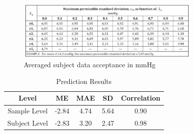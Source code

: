 \documentclass{article}
\begin{document}
\begin{figure}[H]
\centering
\includegraphics[width=0.8\textwidth]{./Fig/ME_STD_Correspond.png}
\caption{Averaged subject data acceptance in mmHg}
\label{ME_STD}
\end{figure}

\begin{table}[h!]
\centering
\begin{tabular}{|c|c|c|c|c|}
\hline
Level & ME & MAE & SD & Correlation \\ \hline
Sample Level & -2.84 & 4.74 & 5.64 & 0.90 \\ \hline
Subject Level & -2.83 & 3.20 & 2.47 & 0.98 \\ \hline
\end{tabular}
\caption{Prediction Results}
\label{tab:metrics}
\end{table}
\end{document}
